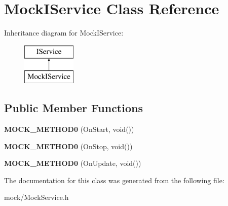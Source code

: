 \hypertarget{classMockIService}{}\section{Mock\+I\+Service Class Reference}
\label{classMockIService}
Inheritance diagram for Mock\+I\+Service\+:\begin{figure}[H]
\begin{center}
\leavevmode
\includegraphics[height=2.000000cm]{classMockIService}
\end{center}
\end{figure}
\subsection*{Public Member Functions}
\begin{DoxyCompactItemize}
\item 
{\bfseries M\+O\+C\+K\+\_\+\+M\+E\+T\+H\+O\+D0} (On\+Start, void())\hypertarget{classMockIService_af9bb268e980dc4891b8b4764cf0643e4}{}\label{classMockIService_af9bb268e980dc4891b8b4764cf0643e4}

\item 
{\bfseries M\+O\+C\+K\+\_\+\+M\+E\+T\+H\+O\+D0} (On\+Stop, void())\hypertarget{classMockIService_aeb3979abaec28cb08b5bb0264989986a}{}\label{classMockIService_aeb3979abaec28cb08b5bb0264989986a}

\item 
{\bfseries M\+O\+C\+K\+\_\+\+M\+E\+T\+H\+O\+D0} (On\+Update, void())\hypertarget{classMockIService_adf9053c180433c818d6e8ef6a1612c27}{}\label{classMockIService_adf9053c180433c818d6e8ef6a1612c27}

\end{DoxyCompactItemize}


The documentation for this class was generated from the following file\+:\begin{DoxyCompactItemize}
\item 
mock/Mock\+Service.\+h\end{DoxyCompactItemize}
